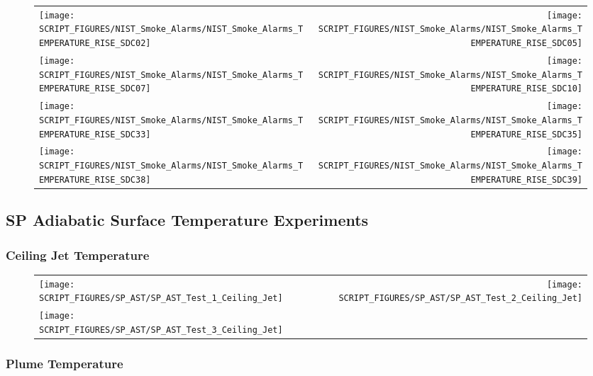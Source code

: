 \begin{figure}[p]
\begin{tabular*}{\textwidth}{l@{\extracolsep{\fill}}r}
\texttt{[image: SCRIPT\_FIGURES/NIST\_Smoke\_Alarms/NIST\_Smoke\_Alarms\_TEMPERATURE\_RISE\_SDC02]} &
\texttt{[image: SCRIPT\_FIGURES/NIST\_Smoke\_Alarms/NIST\_Smoke\_Alarms\_TEMPERATURE\_RISE\_SDC05]} \\
\texttt{[image: SCRIPT\_FIGURES/NIST\_Smoke\_Alarms/NIST\_Smoke\_Alarms\_TEMPERATURE\_RISE\_SDC07]} &
\texttt{[image: SCRIPT\_FIGURES/NIST\_Smoke\_Alarms/NIST\_Smoke\_Alarms\_TEMPERATURE\_RISE\_SDC10]} \\
\texttt{[image: SCRIPT\_FIGURES/NIST\_Smoke\_Alarms/NIST\_Smoke\_Alarms\_TEMPERATURE\_RISE\_SDC33]} &
\texttt{[image: SCRIPT\_FIGURES/NIST\_Smoke\_Alarms/NIST\_Smoke\_Alarms\_TEMPERATURE\_RISE\_SDC35]} \\
\texttt{[image: SCRIPT\_FIGURES/NIST\_Smoke\_Alarms/NIST\_Smoke\_Alarms\_TEMPERATURE\_RISE\_SDC38]} &
\texttt{[image: SCRIPT\_FIGURES/NIST\_Smoke\_Alarms/NIST\_Smoke\_Alarms\_TEMPERATURE\_RISE\_SDC39]}
\end{tabular*}
\end{figure}

\clearpage

\subsection{SP Adiabatic Surface Temperature Experiments}

\subsubsection{Ceiling Jet Temperature}

\begin{figure}[p]
\begin{tabular*}{\textwidth}{l@{\extracolsep{\fill}}r}
\texttt{[image: SCRIPT\_FIGURES/SP\_AST/SP\_AST\_Test\_1\_Ceiling\_Jet]} &
\texttt{[image: SCRIPT\_FIGURES/SP\_AST/SP\_AST\_Test\_2\_Ceiling\_Jet]} \\
\texttt{[image: SCRIPT\_FIGURES/SP\_AST/SP\_AST\_Test\_3\_Ceiling\_Jet]}
\end{tabular*}
\end{figure}

\clearpage

\subsubsection{Plume Temperature}

